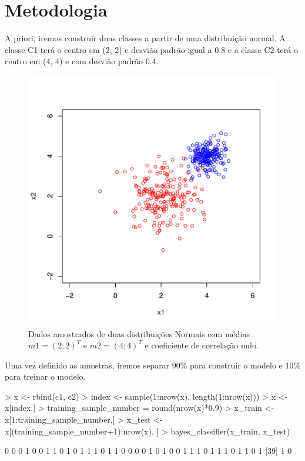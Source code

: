 \documentclass[12pt]{article}
\begin{document}
\section{Metodologia}

  \par A priori, iremos construir duas classes a partir de uma distribuição normal. A classe C1 terá o centro em (2, 2) e desvião padrão igual a 0.8 e a classe C2 terá o centro em  (4, 4) e com desvião padrão 0.4. 
  
\begin{figure}[h]
\centering
\includegraphics{BayesClassifier-004}
\caption{Dados amostrados de duas distribuições Normais com médias $m1 = (2; 2)^T$
e $m2 = (4; 4)^T$ e coeficiente de correlação nulo.}
\label{ex1}
\end{figure}

  \par Uma vez definido as amostras, iremos separar $90\%$ para construir o modelo e $10\%$ para treinar o modelo. 
  
\begin{Schunk}
\begin{Sinput}
> x <- rbind(c1, c2)
> index <- sample(1:nrow(x), length(1:nrow(x)))
> x <- x[index,]
> training_sample_number = round(nrow(x)*0.9)
> x_train <- x[1:training_sample_number,]
> x_test <- x[(training_sample_number+1):nrow(x), ]
> bayes_classifier(x_train, x_test)
\end{Sinput}
\begin{Soutput}
 [1] 0 0 0 1 0 0 1 1 0 1 0 1 1 1 0 1 1 0 0 0 0 1 0 1 0 0 1 1 1 0 1 1 1 0 1 1 0 1
[39] 1 0
\end{Soutput}
\end{Schunk}
\end{document}
